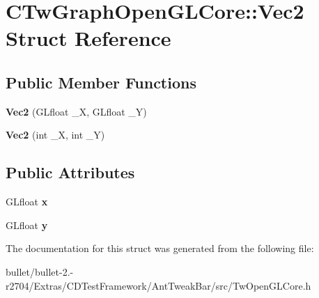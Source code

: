 \hypertarget{struct_c_tw_graph_open_g_l_core_1_1_vec2}{\section{C\+Tw\+Graph\+Open\+G\+L\+Core\+:\+:Vec2 Struct Reference}
\label{struct_c_tw_graph_open_g_l_core_1_1_vec2}
}
\subsection*{Public Member Functions}
\begin{DoxyCompactItemize}
\item 
\hypertarget{struct_c_tw_graph_open_g_l_core_1_1_vec2_ad3dac48e89d887e2a942a1f3e09d4979}{{\bfseries Vec2} (G\+Lfloat \+\_\+\+X, G\+Lfloat \+\_\+\+Y)}\label{struct_c_tw_graph_open_g_l_core_1_1_vec2_ad3dac48e89d887e2a942a1f3e09d4979}

\item 
\hypertarget{struct_c_tw_graph_open_g_l_core_1_1_vec2_a7d2762a307153bd9572d7e384b98ee74}{{\bfseries Vec2} (int \+\_\+\+X, int \+\_\+\+Y)}\label{struct_c_tw_graph_open_g_l_core_1_1_vec2_a7d2762a307153bd9572d7e384b98ee74}

\end{DoxyCompactItemize}
\subsection*{Public Attributes}
\begin{DoxyCompactItemize}
\item 
\hypertarget{struct_c_tw_graph_open_g_l_core_1_1_vec2_a937fd38ae9c490622c2572de80f7c70b}{G\+Lfloat {\bfseries x}}\label{struct_c_tw_graph_open_g_l_core_1_1_vec2_a937fd38ae9c490622c2572de80f7c70b}

\item 
\hypertarget{struct_c_tw_graph_open_g_l_core_1_1_vec2_a5dad383e6cd48ff8fb1de82d5818377e}{G\+Lfloat {\bfseries y}}\label{struct_c_tw_graph_open_g_l_core_1_1_vec2_a5dad383e6cd48ff8fb1de82d5818377e}

\end{DoxyCompactItemize}


The documentation for this struct was generated from the following file\+:\begin{DoxyCompactItemize}
\item 
bullet/bullet-\/2.-\/r2704/\+Extras/\+C\+D\+Test\+Framework/\+Ant\+Tweak\+Bar/src/Tw\+Open\+G\+L\+Core.\+h\end{DoxyCompactItemize}
